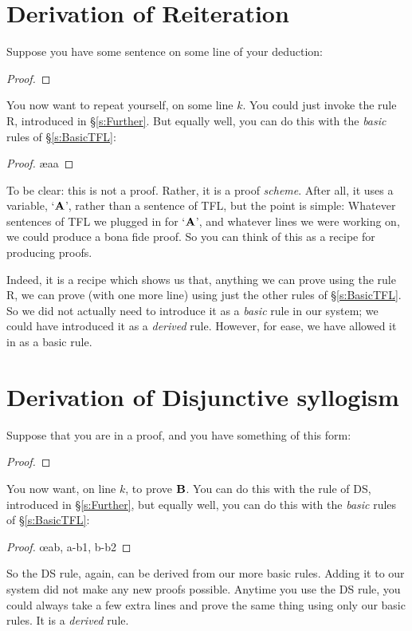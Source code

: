 \section{Derivation of Reiteration}
Suppose you have some sentence on some line of your deduction:
\begin{proof}
\end{proof}
You now want to repeat yourself, on some line $k$. You could just invoke the rule R, introduced in \S\ref{s:Further}. But equally well, you can do this with the \emph{basic} rules of \S\ref{s:BasicTFL}:
\begin{proof}
	\ae{aa}
\end{proof}
To be clear: this is not a proof. Rather, it is a proof  \emph{scheme}. After all, it uses a variable, `$\mathbf{A}$', rather than a sentence of TFL, but the point is simple: Whatever sentences of TFL we plugged in for `$\mathbf{A}$', and whatever lines we were working on, we could produce a bona fide proof. So you can think of this as a recipe for producing proofs. 

Indeed, it is a recipe which shows us that, anything we can prove using the rule R, we can prove (with one more line) using just the other rules of \S\ref{s:BasicTFL}. So we did not actually need to introduce it as a \emph{basic} rule in our system; we could have introduced it as a \emph{derived} rule. However, for ease, we have allowed it in as a basic rule. 


\section{Derivation of Disjunctive syllogism}
Suppose that you are in a proof, and you have something of this form:
\begin{proof}
\end{proof}
You now want, on line $k$, to prove $\mathbf{B}$. You can do this with the rule of DS, introduced in \S\ref{s:Further}, but equally well, you can do this with the \emph{basic} rules of \S\ref{s:BasicTFL}:
	\begin{proof}
		\open
		\close
		\open
		\close
	\oe{ab, a-b1, b-b2}
\end{proof}
So the DS rule, again, can be derived from our more basic rules. Adding it to our system did not make any new proofs possible. Anytime you use the DS rule, you could always take a few extra lines and prove the same thing using only our basic rules. It is a \emph{derived} rule.

